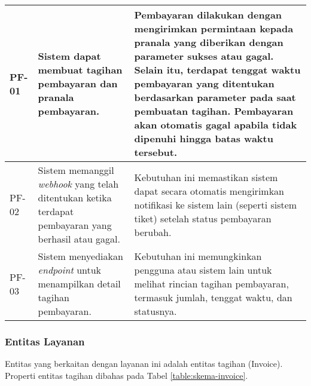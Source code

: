 \begin{longtable}{|l|p{}|p{}|}
    \endfoot
    \hline
    \endlastfoot
    \hline
    PF-01       & Sistem dapat membuat tagihan pembayaran dan pranala pembayaran.                                              & Pembayaran dilakukan dengan mengirimkan permintaan kepada pranala yang diberikan dengan parameter sukses atau gagal. Selain itu, terdapat tenggat waktu pembayaran yang ditentukan berdasarkan parameter pada saat pembuatan tagihan. Pembayaran akan otomatis gagal apabila tidak dipenuhi hingga batas waktu tersebut. \\
    \hline
    PF-02       & Sistem memanggil \textit{webhook} yang telah ditentukan ketika terdapat pembayaran yang berhasil atau gagal. & Kebutuhan ini memastikan sistem dapat secara otomatis mengirimkan notifikasi ke sistem lain (seperti sistem tiket) setelah status pembayaran berubah.                                                                                                                                                                    \\
    \hline
    PF-03       & Sistem menyediakan \textit{endpoint} untuk menampilkan detail tagihan pembayaran.                            & Kebutuhan ini memungkinkan pengguna atau sistem lain untuk melihat rincian tagihan pembayaran, termasuk jumlah, tenggat waktu, dan statusnya.                                                                                                                                                                            \\
\end{longtable}
\endgroup

\subsubsection{Entitas Layanan}

Entitas yang berkaitan dengan layanan ini adalah entitas tagihan (Invoice). Properti entitas tagihan dibahas pada Tabel \ref{table:skema-invoice}.

\pagebreak

